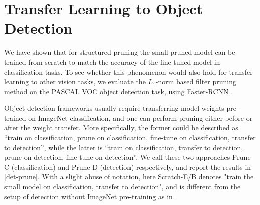 \section{Transfer Learning to Object Detection}
\label{sec:transfer}

We have shown that for structured pruning the small pruned model can be trained from scratch to match the accuracy of the fine-tuned model in classification tasks. To see whether this phenomenon would also hold for transfer learning to other vision tasks, we evaluate the $L_1$-norm based filter pruning method \citep{li2016pruning} on the PASCAL VOC object detection task, using Faster-RCNN \citep{ren2015faster}. 
\vspace{-1ex}

Object detection frameworks usually require transferring model weights pre-trained on ImageNet classification, and one can perform pruning either before or after the weight transfer. More specifically, the former could be described as ``train on classification, prune on classification, fine-tune on classification, transfer to detection'', while the latter is ``train on classification, transfer to detection, prune on detection, fine-tune on detection''. We call these two approaches Prune-C (classification) and Prune-D (detection) respectively, and report the results in \autoref{det-prune}. With a slight abuse of notation, here Scratch-E/B denotes "train the small model on classification, transfer to detection", and is different from the setup of detection without ImageNet pre-training as in \cite{dsod}.

\begin{table}[ht]
\begin{minipage}{\linewidth}
\centering
\small
\vspace{2ex}
\label{det-prune}
\end{minipage}\hfill
\vspace{-4ex}
\end{table}

